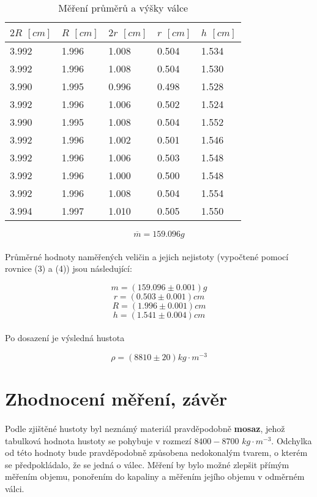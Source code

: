 \documentclass[a4paper,11pt]{article}
\begin{document}
     \begin{table}[h]
        \centering
            \begin{tabular}{ | l | l || l | l | l | }
                \hline
                $2R$ $[cm]$ & $R$ $[cm]$ & $2r$ $[cm]$ & $r$ $[cm]$ & $h$ $[cm]$ \\ \hline
                3.992 & 1.996 & 1.008 & 0.504 & 1.534 \\ \hline
                3.992 & 1.996 & 1.008 & 0.504 & 1.530 \\ \hline
                3.990 & 1.995 & 0.996 & 0.498 & 1.528 \\ \hline
                3.992 & 1.996 & 1.006 & 0.502 & 1.524 \\ \hline
                3.990 & 1.995 & 1.008 & 0.504 & 1.552 \\ \hline
                3.992 & 1.996 & 1.002 & 0.501 & 1.546 \\ \hline
                3.992 & 1.996 & 1.006 & 0.503 & 1.548 \\ \hline
                3.992 & 1.996 & 1.000 & 0.500 & 1.548 \\ \hline
                3.992 & 1.996 & 1.008 & 0.504 & 1.554 \\ \hline
                3.994 & 1.997 & 1.010 & 0.505 & 1.550 \\
                \hline
            \end{tabular}
        \caption{Měření průměrů a výšky válce}
        \label{fig:method_b}
    \end{table}

    $$\overline{m} = 159.096g$$

    \paragraph{} Průměrné hodnoty naměřených veličin a jejich nejistoty (vypočtené pomocí rovnice (3) a (4)) jsou následující:

    $$m = (159.096 \pm 0.001)g$$
    $$r = (0.503 \pm 0.001)cm$$
    $$R = (1.996 \pm 0.001)cm$$
    $$h = (1.541 \pm 0.004)cm$$

    \paragraph{} Po dosazení je výsledná hustota

    $$\rho = \left(8810 \pm 20 \right) kg \cdot m^{-3}$$

\section{Zhodnocení měření, závěr}

    \paragraph{} Podle zjištěné hustoty byl neznámý materiál pravděpodobně \textbf{mosaz}, jehož tabulková
    hodnota hustoty se pohybuje v rozmezí $8400 - 8700$ $kg \cdot m^{-3}$. Odchylka od této hodnoty bude 
    pravděpodobně způsobena nedokonalým tvarem, o kterém se předpokládalo, že se jedná o válec. Měření by
    bylo možné zlepšit přímým měřením objemu, ponořením do kapaliny a měřením jejího objemu v odměrném válci.
\end{document}
